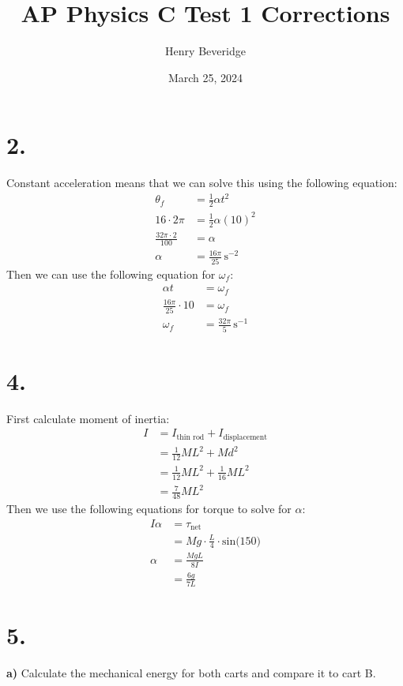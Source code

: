 \documentclass{article}
\title{AP Physics C Test 1 Corrections}
\author{Henry Beveridge}
\date{March 25, 2024}
\begin{document}
\maketitle

\section*{2.}
Constant acceleration means that we can solve this using the following equation:
\begin{align*}
    \theta_f&=\frac{1}{2}\alpha t^2 \\
    16 \cdot2\pi&= \frac{1}{2}\alpha(10)^2 \\
    \frac{32\pi\cdot 2}{100} &= \alpha \\
    \alpha &= \frac{16\pi}{25} \,\text{s}^{-2}
\end{align*}
Then we can use the following equation for $\omega_f$:
\begin{align*}
\alpha t &= \omega_f \\
\frac{16\pi}{25}\cdot10 &= \omega_f \\
\omega_f &= \frac{32\pi}{5} \,\text{s}^{-1}
\end{align*}

\section*{4.}
First calculate moment of inertia:
\begin{align*}
I &= I_\text{thin rod} + I_\text{displacement} \\
&= \frac{1}{12}ML^2 + Md^2 \\
&= \frac{1}{12}ML^2 + \frac{1}{16}ML^2 \\
&= \frac{7}{48}ML^2
\end{align*}
Then we use the following equations for torque to solve for $\alpha$:
\begin{align*}
    I\alpha &= \tau_\text{net} \\
    &= Mg\cdot \frac{L}{4} \cdot \text{sin(150)} \\
    \alpha &= \frac{MgL}{8I} \\
    &= \frac{6g}{7L}
\end{align*}

\section*{5.}
\textbf{a)} Calculate the mechanical energy for both carts and compare it to cart B.
\end{document}

